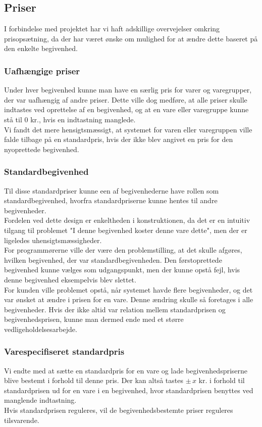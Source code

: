 \documentclass[]{article}
\begin{document}
\subsection{Priser}
I forbindelse med projektet har vi haft adskillige overvejelser omkring prisopsætning, da der har været ønske om mulighed for at ændre dette baseret på den enkelte begivenhed.

\subsubsection{Uafhængige priser}
\noindent Under hver begivenhed kunne man have en særlig pris for varer og varegrupper, der var uafhængig af andre priser. Dette ville dog medføre, at alle priser skulle indtastes ved oprettelse af en begivenhed, og at en vare eller varegruppe kunne stå til 0 kr., hvis en indtastning manglede. \\
Vi fandt det mere hensigtsmæssigt, at systemet for varen eller varegruppen ville falde tilbage på en standardpris, hvis der ikke blev angivet en pris for den nyoprettede begivenhed. 

\subsubsection{Standardbegivenhed}
\noindent Til disse standardpriser kunne een af begivenhederne have rollen som standardbegivenhed, hvorfra standardpriserne kunne hentes til andre begivenheder. \\
Fordelen ved dette design er enkeltheden i konstruktionen, da det er en intuitiv tilgang til problemet "I denne begivenhed koster denne vare dette", men der er ligeledes uhensigtsmæssigheder.\\
For programmørerne ville der være den problemstilling, at det skulle afgøres, hvilken begivenhed, der var standardbegivenheden. Den førstoprettede begivenhed kunne vælges som udgangspunkt, men der kunne opstå fejl, hvis denne begivenhed eksempelvis blev slettet. \\
For kunden ville problemet opstå, når systemet havde flere begivenheder, og det var ønsket at ændre i prisen for en vare. Denne ændring skulle så foretages i alle begivenheder. Hvis der ikke altid var relation mellem standardprisen og begivenhedsprisen, kunne man dermed ende med et større vedligeholdelsesarbejde.

\subsubsection{Varespecifiseret standardpris} \label{VarePris}
\noindent Vi endte med at sætte en standardpris for en vare og lade begivenhedspriserne blive bestemt i forhold til denne pris. Der kan altså tastes $\pm \, x$ kr. i forhold til standardprisen ud for en vare i en begivenhed, hvor standardprisen benyttes ved manglende indtastning. \\
Hvis standardprisen reguleres, vil de begivenhedsbestemte priser reguleres tilsvarende. 
\end{document}
